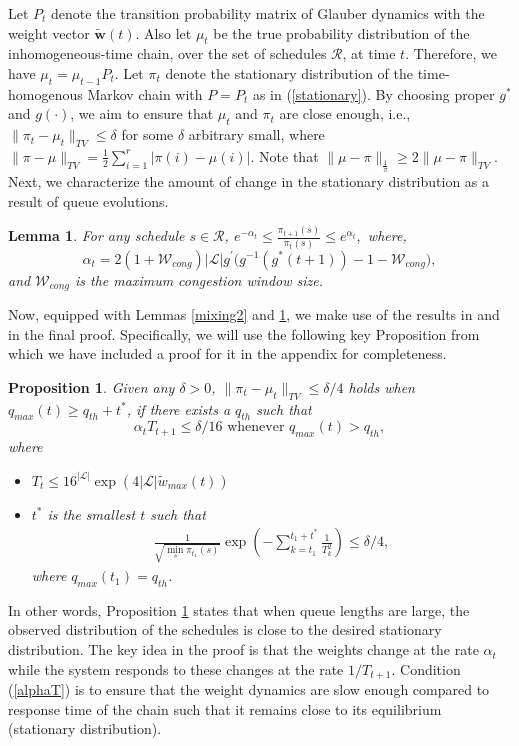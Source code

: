 \documentclass[10pt,onecolumn,draftclsnofoot,journal]{IEEEtran}
\newtheorem{lemma}{Lemma}
\newtheorem{proposition}{Proposition}
\newcommand{\mW} {\mathcal{W}}
\newcommand{\be}{\begin{eqnarray}}
\newcommand{\ee}{\end{eqnarray}}
\begin{document}
Let $P_t$ denote the transition probability matrix of Glauber dynamics with the weight vector $\mathbf{\tilde{w}}(t)$.
Also let $\mu_t$ be the true probability distribution of the inhomogeneous-time chain, over the set of schedules $\mathcal{R}$, at time  $t$.
Therefore, we have $\mu_t=\mu_{t-1}P_t$. Let $\pi_t$ denote the stationary distribution of the time-homogenous Markov chain with $P=P_t$ as in (\ref{stationary}).
By choosing proper $g^*$ and $g(\cdot)$, we aim to ensure that $\mu_t$ and $\pi_t$ are close enough, i.e.,
$
 \|\pi_t-\mu_t\|_{TV} \leq \delta
$
for some $\delta$ arbitrary small, where
$\|\pi-\mu\|_{TV}=\frac{1}{2}\sum_{i=1}^r|\pi(i)-\mu(i)|.
$
Note that $
\|\mu-\pi\|_{\frac{1}{\pi}} \geq 2 \|\mu - \pi\|_{TV}.
$
Next, we characterize the amount of change in the stationary distribution as a result of queue evolutions.
\begin{lemma} \label{alpha ratio}
For any schedule $s \in \mathcal{R}$,
$
e^{-\alpha_t}\leq \frac{\pi_{t+1}(s)}{\pi_t(s)} \leq e^{\alpha_t},
$
where,
\begin{equation} \label{eq: alpha}
\alpha_t= 2(1+\mW_{cong})|\mathcal{L}| g^\prime\Big(g^{-1}(g^*(t+1))-1-\mW_{cong}\Big),
\end{equation}
and $\mW_{cong}$ is the maximum congestion window size.
\end{lemma}
Now, equipped with Lemmas \ref{mixing2} and \ref{alpha ratio}, we make use of the results in \cite{shah, shah2} and \cite{ghaderi} in the final proof. Specifically, we will use the following key Proposition from \cite{ghaderi} which we have included a proof for it in the appendix for completeness.
\begin{proposition}\label{drift}
Given any $\delta >0$, $\|\pi_t-\mu_t\|_{TV} \leq \delta/4$ holds when $ q_{max}(t)\geq q_{th}+t^*$, if there exists a $q_{th}$ such that
\begin{equation}\label{alphaT}
\alpha_t T_{t+1} \leq \delta/16\mbox{ whenever } q_{max}(t) > q_{th},
\end{equation}
where
\begin{itemize}
\item[(i)] $T_t \leq 16^{|\mathcal{L}|}\exp(4|\mathcal{L}|\tilde{w}_{max}(t))$
\item [(ii)] $t^*$ is the smallest $t$ such that
\be\label{t*}
\frac{1}{\sqrt{\min_s \pi_{t_1}(s)}} \exp(-\sum_{k=t_1}^{t_1+t^*}\frac{1}{T^2_k}) \leq \delta/4,
\ee
where $q_{max}(t_1)=q_{th}$.
\end{itemize}
\end{proposition}
In other words, Proposition \ref{drift} states that when queue lengths are large, the observed distribution of the schedules is close to the desired stationary distribution. The key idea in the proof is that the weights change at the rate $\alpha_t$ while the system responds to these changes at the rate $1/T_{t+1}$. Condition (\ref{alphaT}) is to ensure that the weight dynamics are slow enough compared to response time of the chain such that it remains close to its equilibrium (stationary distribution).
\end{document}
